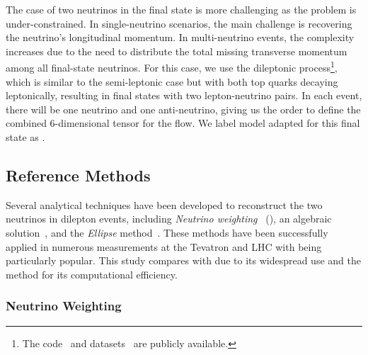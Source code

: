 The case of two neutrinos in the final state is more challenging as the problem is under-constrained.
In single-neutrino scenarios, the main challenge is recovering the neutrino's longitudinal momentum.
In multi-neutrino events, the complexity increases due to the need to distribute the total missing transverse momentum among all final-state neutrinos.
For this case, we use the dileptonic \ttbar process\footnote{The code~\cite{DileptonicTtbarNeutrino} and datasets~\cite{Nu2FlowsCode} are publicly available.}, which is similar to the semi-leptonic case but with both top quarks decaying leptonically, resulting in final states with two lepton-neutrino pairs.
In each event, there will be one neutrino and one anti-neutrino, giving us the order to define the combined 6-dimensional tensor for the flow.
We label model adapted for this final state as \vvflows.

\subsection{Reference Methods}

Several analytical techniques have been developed to reconstruct the two neutrinos in dilepton \ttbar events, including \emph{Neutrino weighting}~\cite{NuW} (\vweight), an algebraic solution~\cite{AlgebraicApproachSolve}, and the \emph{Ellipse} method~\cite{EllipseMethod}.
These methods have been successfully applied in numerous measurements at the Tevatron and LHC with \vweight being particularly popular.
This study compares \vvflows with \vweight due to its widespread use and the \ellipse method for its computational efficiency.

\subsubsection{Neutrino Weighting}

